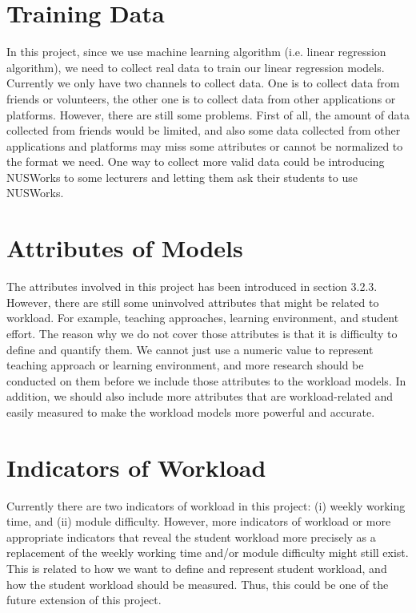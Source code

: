 \documentclass[fyp]{socreport}
\begin{document}
\section{Training Data}
In this project, since we use machine learning algorithm (i.e. linear regression algorithm), we need to collect real data to train our linear regression models. Currently we only have two channels to collect data. One is to collect data from friends or volunteers, the other one is to collect data from other applications or platforms. However, there are still some problems. First of all, the amount of data collected from friends would be limited, and also some data collected from other applications and platforms may miss some attributes or cannot be normalized to the format we need. One way to collect more valid data could be introducing NUSWorks to some lecturers and letting them ask their students to use NUSWorks.

\section{Attributes of Models}
The attributes involved in this project has been introduced in section 3.2.3. However, there are still some uninvolved attributes that might be related to workload. For example, teaching approaches, learning environment, and student effort. The reason why we do not cover those attributes is that it is difficulty to define and quantify them. We cannot just use a numeric value to represent teaching approach or learning environment, and more research should be conducted on them before we include those attributes to the workload models. In addition, we should also include more attributes that are workload-related and easily measured to make the workload models more powerful and accurate.

\section{Indicators of Workload}
Currently there are two indicators of workload in this project: (i) weekly working time, and (ii) module difficulty. However, more indicators of workload or more appropriate indicators that reveal the student workload more precisely as a replacement of the weekly working time and/or module difficulty might still exist. This is related to how we want to define and represent student workload, and how the student workload should be measured. Thus, this could be one of the future extension of this project.
\end{document}
